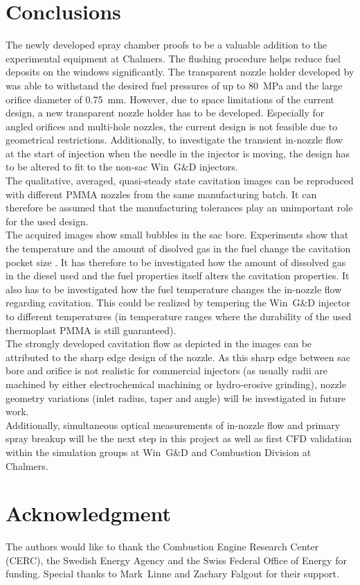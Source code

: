 \documentclass[letterpaper,twocolumn,10pt]{ilass}
\begin{document}
\section*{Conclusions}
The newly developed spray chamber proofs to be a valuable addition to the experimental equipment
at Chalmers. The flushing procedure helps reduce fuel deposits on the windows significantly.
The transparent nozzle holder developed by \cite{Falgout2015} was able to withstand the desired
fuel pressures of up to 80~MPa and the large orifice diameter of 0.75~mm. However, due to space
limitations of the current design, a new transparent nozzle holder has to be developed.
Especially for angled orifices and multi-hole nozzles, the current design is not feasible due
to geometrical restrictions. Additionally, to investigate the transient in-nozzle flow at the
start of injection when the needle in the injector is moving, the design has to be altered to
fit to the non-sac Win~G\&D injectors.\\
%
The qualitative, averaged, quasi-steady state cavitation images can be reproduced with different
PMMA nozzles from the same manufacturing batch. It can therefore be assumed that the
manufacturing tolerances play an unimportant role for the used design.\\
%
The acquired images show small bubbles in the sac bore. Experiments show that the temperature
and the amount of disolved gas in the fuel change the cavitation pocket size \cite{Watanabe2014}.
It has therefore to be investigated how the amount of dissolved gas in the diesel used and
the fuel properties itself alters the cavitation properties. It also has to be investigated
how the fuel temperature changes the in-nozzle flow regarding cavitation. This could be realized
by tempering the Win~G\&D injector to different temperatures (in temperature ranges where the
durability of the used thermoplast PMMA is still guaranteed).\\
%
The strongly developed cavitation flow as depicted in the images can be attributed to the
sharp edge design of the nozzle. As this sharp edge between sac bore and orifice is not
realistic for commercial injectors (as usually radii are machined by either electrochemical
machining or hydro-erosive grinding), nozzle geometry variations (inlet radius, taper and angle)
will be investigated in future work.\\
%
Additionally, simultaneous optical measurements of in-nozzle flow and primary spray breakup
will be the next step in this project as well as first CFD validation within the simulation
groups at Win~G\&D and Combustion Division at Chalmers.\\
%



\section*{Acknowledgment}
The authors would like to thank the Combustion Engine Research Center (CERC),
the Swedish Energy Agency and the Swiss Federal Office of Energy for funding.
Special thanks to Mark~Linne and Zachary Falgout for their support.
\newline



\end{document}
